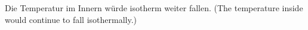Die Temperatur im Innern würde isotherm weiter fallen.  
(The temperature inside would continue to fall isothermally.)